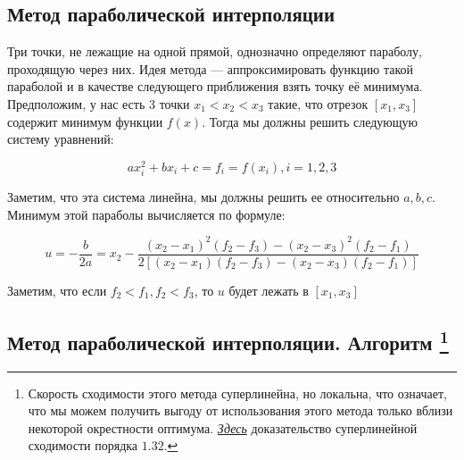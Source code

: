 \documentclass[
  russian,
  letterpaper,
  DIV=11,
  numbers=noendperiod]{scrartcl}
\begin{document}
\subsection{Метод параболической
интерполяции}\label{ux43cux435ux442ux43eux434-ux43fux430ux440ux430ux431ux43eux43bux438ux447ux435ux441ux43aux43eux439-ux438ux43dux442ux435ux440ux43fux43eux43bux44fux446ux438ux438}

Три точки, не лежащие на одной прямой, однозначно определяют параболу,
проходящую через них. Идея метода --- аппроксимировать функцию такой
параболой и в качестве следующего приближения взять точку её минимума.
Предположим, у нас есть 3 точки \(x_1 < x_2 < x_3\) такие, что отрезок
\([x_1, x_3]\) содержит минимум функции \(f(x)\). Тогда мы должны решить
следующую систему уравнений:

\[
ax_i^2 + bx_i + c = f_i = f(x_i), i = 1,2,3 
\]

Заметим, что эта система линейна, мы должны решить ее относительно
\(a,b,c\). Минимум этой параболы вычисляется по формуле:

\[
u = -\dfrac{b}{2a} = x_2 - \dfrac{(x_2 - x_1)^2(f_2 - f_3) - (x_2 - x_3)^2(f_2 - f_1)}{2\left[ (x_2 - x_1)(f_2 - f_3) - (x_2 - x_3)(f_2 - f_1)\right]}
\]

Заметим, что если \(f_2 < f_1, f_2 < f_3\), то \(u\) будет лежать в
\([x_1, x_3]\)

\subsection[Метод параболической интерполяции. Алгоритм
]{\texorpdfstring{Метод параболической интерполяции. Алгоритм
\footnote{Скорость сходимости этого метода суперлинейна, но локальна,
  что означает, что мы можем получить выгоду от использования этого
  метода только вблизи некоторой окрестности оптимума.
  \href{https://people.math.sc.edu/kellerlv/Quadratic_Interpolation.pdf}{\emph{Здесь}}
  доказательство суперлинейной сходимости порядка \(1.32\).}}{Метод параболической интерполяции. Алгоритм }}\label{ux43cux435ux442ux43eux434-ux43fux430ux440ux430ux431ux43eux43bux438ux447ux435ux441ux43aux43eux439-ux438ux43dux442ux435ux440ux43fux43eux43bux44fux446ux438ux438.-ux430ux43bux433ux43eux440ux438ux442ux43c-2}
\end{document}
